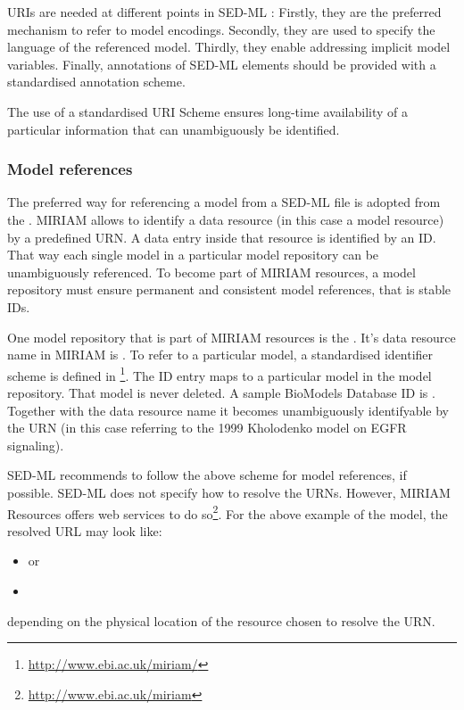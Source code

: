 \label{sec:uriScheme}

URIs are needed at different points in SED-ML \LoneVone: 
Firstly, they are the preferred mechanism to refer to model encodings. 
Secondly, they are used to specify the language of the referenced model.
Thirdly, they enable addressing implicit model variables.
Finally, annotations of SED-ML elements should be provided with a standardised annotation scheme.

The use of a standardised URI Scheme ensures long-time availability  of a particular information that can unambiguously be identified. 

\subsubsection{Model references}
\label{sec:modelURI}
The preferred way for referencing a model from a SED-ML file is adopted from the .
MIRIAM allows to identify  a data resource (in this case a model resource) by a predefined URN. A data entry inside that resource is identified by an ID. 
That way each single  model  in a particular model repository can be unambiguously referenced. To become part of MIRIAM resources, a model repository must ensure permanent and consistent model references, that is stable IDs.

One model repository that is part of MIRIAM resources is the  \citep{LDR+10}. It's data resource name in MIRIAM is . To refer to a particular model, a standardised identifier scheme is defined in \footnote{\url{http://www.ebi.ac.uk/miriam/}}. The ID entry maps to a particular model in the model repository. That model is never deleted. 
A sample BioModels Database ID is . Together with the data resource name it becomes unambiguously identifyable by the URN  (in this case referring to the 1999 Kholodenko model on EGFR signaling). 
%

SED-ML recommends to follow the above scheme for model references, if possible. 
SED-ML does not specify how to resolve the URNs. However, MIRIAM Resources offers web services to do so\footnote{\url{http://www.ebi.ac.uk/miriam}}. For the above example of the  model, the resolved URL may look like: 
\begin{itemize}
 \item{ or}
 \item{}
\end{itemize}
depending on the physical location of the resource chosen to resolve the URN.

